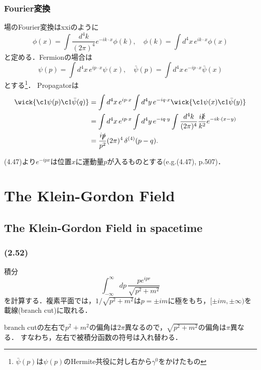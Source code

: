 \subsection{Fourier変換}
場のFourier変換はxxiのように
\[
\phi(x) = \int \frac{d^4k}{(2\pi)^4} e^{-ik\cdot x} \phi(k) , \quad
\phi(k) = \int d^4x \, e^{ik\cdot x} \phi(x)
\]
と定める．Fermionの場合は
\[
\psi(p) = \int d^4x \, e^{ip\cdot x} \psi(x) , \quad
\bar\psi(p) = \int d^4x \, e^{-ip\cdot x} \bar\psi(x)
\]
とする\footnote{\(\bar\psi(p)\)は\(\psi(p)\)のHermite共役に対し右から\(\gamma^0\)をかけたもの}．
Propagatorは
\begin{align*}
    \wick{\c1{\psi}(p) \c1{\bar\psi}(q)}
    &= \int d^4x \, e^{ip\cdot x} \int d^4y \, e^{-iq\cdot x} \wick{\c1{\psi}(x) \c1{\bar\psi}(y)} \\
    &= \int d^4x \, e^{ip\cdot x} \int d^4y \, e^{-iq\cdot y} \int \frac{d^4k}{(2\pi)^4} \frac{i\slashed{k}}{k^2} e^{-ik\cdot(x-y)} \\
    &= \frac{i\slashed{p}}{p^2} (2\pi)^4 \mathop{\delta^{(4)}}(p-q) .
\end{align*}

(4.47)より\(e^{-ipx}\)は位置\(x\)に運動量\(p\)が入るものとする(e.g.\@ (4.47), p.\@ 507)．

\setcounter{chapter}{1}
\chapter{The Klein-Gordon Field}
\setcounter{section}{3}
\section{The Klein-Gordon Field in spacetime}
\subsection{(2.52)}
積分
\[ \int_{-\infty}^\infty dp \, \frac{p e^{ipr}}{\sqrt{p^2 + m^2}} \]
を計算する．複素平面では，$1/\sqrt{p^2+m^2}$は$p = \pm im$に極をもち，$[\pm im, \pm\infty)$を載線(branch cut)に取れる．
\begin{center}
\end{center}
branch cutの左右で$p^2+m^2$の偏角は$2\pi$異なるので，$\sqrt{p^2+m^2}$の偏角は$\pi$異なる．
すなわち，左右で被積分函数の符号は入れ替わる．

